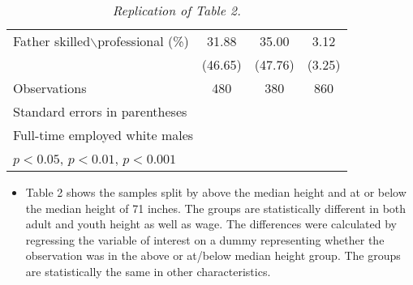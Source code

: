 \documentclass[12pt]{article}
\begin{document}
\begin{table}[h!]
\begin{tabular}{|l | c | c | c |}
        \hline
        \tabindent Father skilled$\backslash$professional (\%) &
                                                 31.88 & 35.00 & 3.12 \\
                                              & (46.65) & (47.76) & (3.25) \\
        \hline
        Observations & 480 & 380 & 860 \\
        \hline\hline   
        \multicolumn{4}{l}{\footnotesize Standard errors in parentheses} \\
        \multicolumn{4}{l}{\footnotesize Full-time employed white males} \\
	\multicolumn{4}{l}{\footnotesize \sym{*} \(p<0.05\), \sym{**} \(p<0.01\), 
                        \sym{***} \(p<0.001\)}\\
    \end{tabular}
    \caption{\textit{Replication of \textcite{Persico2004} Table 2.}}
\end{table}
\begin{itemize}
    \item[] Table 2 shows the samples split by above the median height and at or 
    below the median height of 71 inches.  The groups are statistically 
    different in both adult and youth height as well as wage. The differences 
    were calculated by regressing the variable of interest on a dummy 
    representing whether the observation was in the above or at/below median 
    height group. The groups are statistically the same in other characteristics.
\end{itemize}


\clearpage
\end{document}
